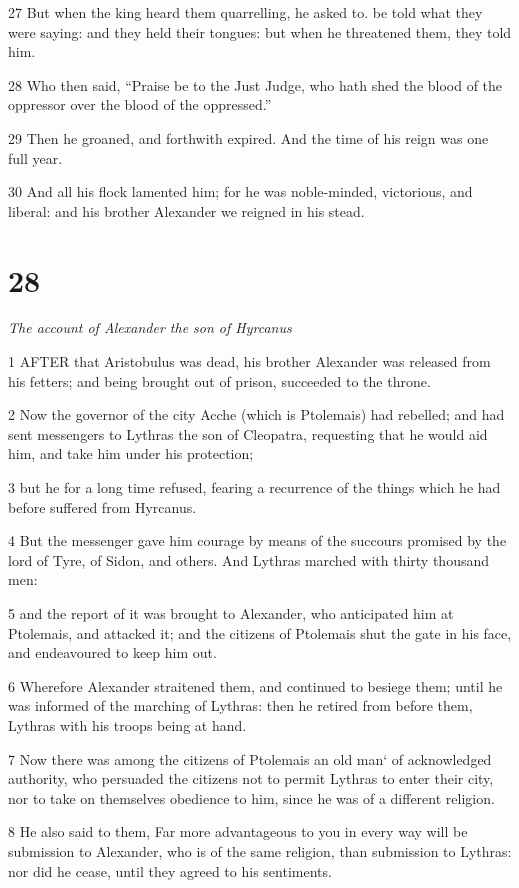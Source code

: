 27 But when the king heard them quarrelling, he asked to. be told what they were saying: and they held their tongues: but when he threatened them, they told him. 

28 Who then said, “Praise be to the Just Judge, who hath shed the blood of the oppressor over the blood of the oppressed.” 

29 Then he groaned, and forthwith expired. And the time of his reign was one full year. 

30 And all his flock lamented him; for he was noble-minded, victorious, and liberal: and his brother Alexander we reigned in his stead. 

\chapter{28}

\par \textit{The account of Alexander the son of Hyrcanus}

1 AFTER that Aristobulus was dead, his brother Alexander was released from his fetters; and being brought out of prison, succeeded to the throne. 

2 Now the governor of the city Acche (which is Ptolemais) had rebelled; and had sent messengers to Lythras the son of Cleopatra, requesting that he would aid him, and take him under his protection; 

3 but he for a long time refused, fearing a recurrence of the things which he had before suffered from Hyrcanus. 

4 But the messenger gave him courage by means of the succours promised by the lord of Tyre, of Sidon, and others. And Lythras marched with thirty thousand men: 

5 and the report of it was brought to Alexander, who anticipated him at Ptolemais, and attacked it; and the citizens of Ptolemais shut the gate in his face, and endeavoured to keep him out. 

6 Wherefore Alexander straitened them, and continued to besiege them; until he was informed of the marching of Lythras: then he retired from before them, Lythras with his troops being at hand. 

7 Now there was among the citizens of Ptolemais an old man‘ of acknowledged authority, who persuaded the citizens not to permit Lythras to enter their city, nor to take on themselves obedience to him, since he was of a different religion. 

8 He also said to them, Far more advantageous to you in every way will be submission to Alexander, who is of the same religion, than submission to Lythras: nor did he cease, until they agreed to his sentiments. 


